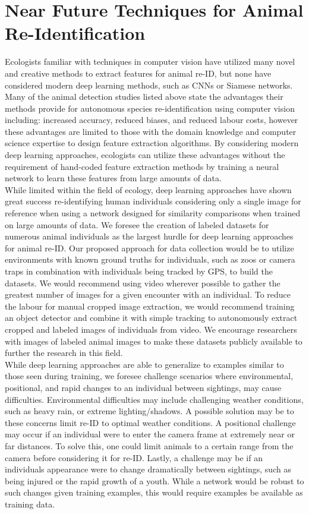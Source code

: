 \documentclass[11pt]{article}
\begin{document}
\section*{Near Future Techniques for Animal Re-Identification}
Ecologists familiar with techniques in computer vision have utilized many novel and creative methods to extract features for animal re-ID, but none have considered modern deep learning methods, such as CNNs or Siamese networks. Many of the animal detection studies listed above state the advantages their methods provide for autonomous species re-identification using computer vision including: increased accuracy, reduced biases, and reduced labour costs, however these advantages are limited to those with the domain knowledge and computer science expertise to design feature extraction algorithms. By considering modern deep learning approaches, ecologists can utilize these advantages without the requirement of hand-coded feature extraction methods by training a neural network to learn these features from large amounts of data.
\newline
\\
While limited within the field of ecology, deep learning approaches have shown great success re-identifying human individuals considering only a single image for reference when using a network designed for similarity comparisons when trained on large amounts of data. We foresee the creation of labeled datasets for numerous animal individuals as the largest hurdle for deep learning approaches for animal re-ID. Our proposed approach for data collection would be to utilize environments with known ground truths for individuals, such as zoos or camera traps in combination with individuals being tracked by GPS, to build the datasets. We would recommend using video wherever possible to gather the greatest number of images for a given encounter with an individual. To reduce the labour for manual cropped image extraction, we would recommend training an object detector and combine it with simple tracking to autonomously extract cropped and labeled images of individuals from video. We encourage researchers with images of labeled animal images to make these datasets publicly available to further the research in this field.
\newline
\\
While deep learning approaches are able to generalize to examples similar to those seen during training, we foresee challenge scenarios where environmental, positional, and rapid changes to an individual between sightings, may cause difficulties. Environmental difficulties may include challenging weather conditions, such as heavy rain, or extreme lighting/shadows. A possible solution may be to these concerns limit re-ID to optimal weather conditions. A positional challenge may occur if an individual were to enter the camera frame at extremely near or far distances. To solve this, one could limit animals to a certain range from the camera before considering it for re-ID. Lastly, a challenge may be if an individuals appearance were to change dramatically between sightings, such as being injured or the rapid growth of a youth. While a network would be robust to such changes given training examples, this would require examples be available as training data.
\end{document}
